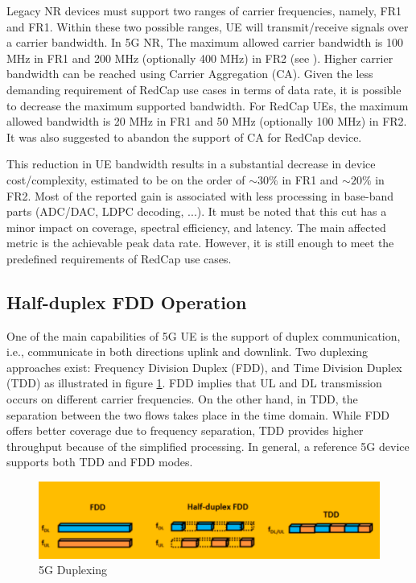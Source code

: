 \documentclass[]{IEEEtran}
\begin{document}
Legacy NR devices must support two ranges of carrier frequencies, namely, FR1 and FR1. Within these two possible ranges, UE will transmit/receive signals over a carrier bandwidth. In 5G NR, The maximum allowed carrier bandwidth is 100 MHz in FR1 and 200 MHz (optionally 400 MHz) in FR2 (see \cite{3gpp_nr_nodate-2_38.101-1,3gpp_nr_2022-7_38.101-2}). Higher carrier bandwidth can be reached using Carrier Aggregation (CA).
Given the less demanding requirement of RedCap use cases in terms of data rate, it is possible to decrease the maximum supported bandwidth. For RedCap UEs, the maximum allowed bandwidth is 20 MHz in FR1 and 50 MHz (optionally 100 MHz) in FR2. It was also suggested to abandon the support of CA for RedCap device.

This reduction in UE bandwidth results in a substantial decrease in device cost/complexity, estimated to be on the order of $\sim30\%$ in FR1 and $\sim20\%$ in  FR2. Most of the reported gain is associated with less processing in base-band parts (ADC/DAC, LDPC decoding, ...).
It must be noted that this cut has a minor impact on coverage, spectral efficiency, and latency. The main affected metric is the achievable peak data rate. However, it is still enough to meet the predefined requirements of RedCap use cases.


\subsection{Half-duplex FDD Operation}
\label{sec:4-3}
One of the main capabilities of 5G UE is the support of duplex communication, i.e., communicate in both directions uplink and downlink. Two duplexing approaches exist: Frequency Division Duplex (FDD), and Time Division Duplex (TDD) as illustrated in figure \ref{fig:5g-duplexing}. FDD implies that UL and DL transmission occurs on different carrier frequencies. On the other hand, in TDD, the separation between the two flows takes place in the time domain. 
While FDD offers better coverage due to frequency separation, TDD provides higher throughput because of the simplified processing. In general, a reference 5G device supports both TDD and FDD modes.

 \begin{figure}
    \centering
    \includegraphics[width=\linewidth]{Pictures/5G Duplexing.png}
    \caption{5G Duplexing}
    \label{fig:5g-duplexing}
\end{figure}
\end{document}
